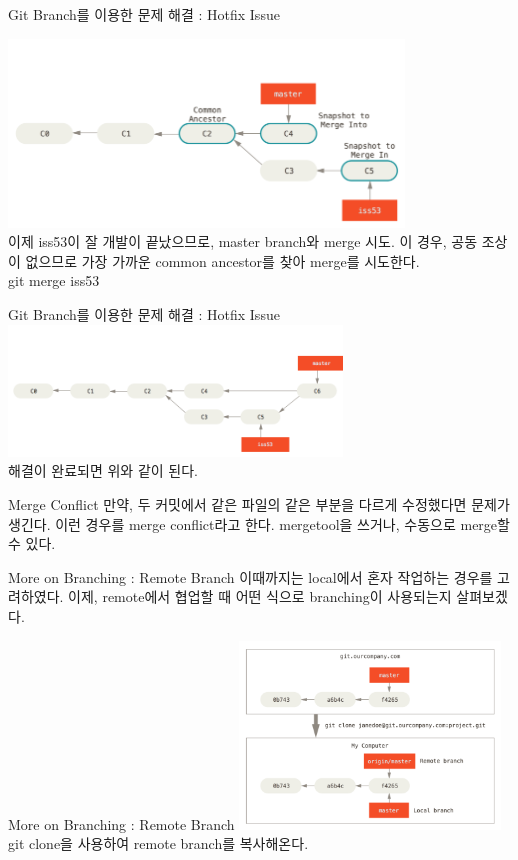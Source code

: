 \documentclass{beamer}
\begin{document}
\begin{frame}{Git Branch를 이용한 문제 해결 : Hotfix Issue} 

\includegraphics[height=5cm,keepaspectratio]{basic-merging-1}  \\
이제 iss53이 잘 개발이 끝났으므로, master branch와 merge 시도. 이 경우, 공동 조상이 없으므로 가장 가까운 common ancestor를 찾아 merge를 시도한다. \\
git merge iss53
\end{frame}

\begin{frame}{Git Branch를 이용한 문제 해결 : Hotfix Issue} 
\includegraphics[height=3.5cm,keepaspectratio]{basic-merging-2}  \\
해결이 완료되면 위와 같이 된다. 
\end{frame}

\begin{frame}{Merge Conflict} 
만약, 두 커밋에서 같은 파일의 같은 부분을 다르게 수정했다면 문제가 생긴다. 이런 경우를 merge conflict라고 한다. mergetool을 쓰거나, 수동으로 merge할 수 있다. 
\end{frame}

\begin{frame}{More on Branching : Remote Branch}
이때까지는 local에서 혼자 작업하는 경우를 고려하였다. 이제, remote에서 협업할 때 어떤 식으로 branching이 사용되는지 살펴보겠다. 
\end{frame}


\begin{frame}{More on Branching : Remote Branch}
\includegraphics[height=5cm,keepaspectratio]{remote-branches-1} \\
git clone을 사용하여 remote branch를 복사해온다. 
\end{frame}
\end{document}
